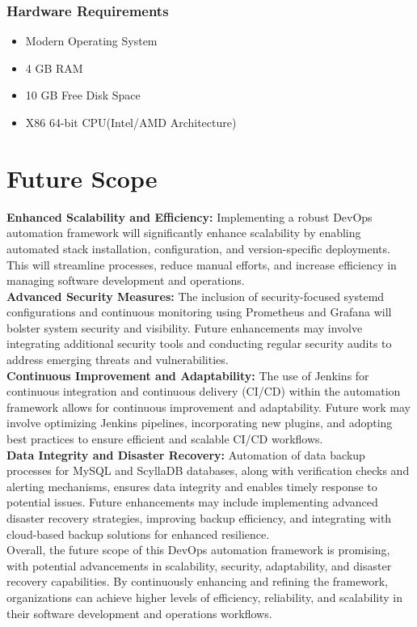 \documentclass[12pt,a4paper,oneside]{report}
\begin{document}
\subsection{Hardware Requirements}

\begin{itemize}
\item{Modern Operating System}
\item{4 GB RAM}
\item{10 GB Free Disk Space}
\item{X86 64-bit CPU(Intel/AMD Architecture)}
\end{itemize}




\newpage
\chapter{Future Scope}
\textbf{Enhanced Scalability and Efficiency: }Implementing a robust DevOps automation framework will significantly enhance scalability by enabling automated stack installation, configuration, and version-specific deployments. This will streamline processes, reduce manual efforts, and increase efficiency in managing software development and operations. \\
\textbf{Advanced Security Measures: } The inclusion of security-focused systemd configurations and continuous monitoring using Prometheus and Grafana will bolster system security and visibility. Future enhancements may involve integrating additional security tools and conducting regular security audits to address emerging threats and vulnerabilities. \\
\textbf{Continuous Improvement and Adaptability: }The use of Jenkins for continuous integration and continuous delivery (CI/CD) within the automation framework allows for continuous improvement and adaptability. Future work may involve optimizing Jenkins pipelines, incorporating new plugins, and adopting best practices to ensure efficient and scalable CI/CD workflows. \\
\textbf{Data Integrity and Disaster Recovery: }Automation of data backup processes for MySQL and ScyllaDB databases, along with verification checks and alerting mechanisms, ensures data integrity and enables timely response to potential issues. Future enhancements may include implementing advanced disaster recovery strategies, improving backup efficiency, and integrating with cloud-based backup solutions for enhanced resilience.\\
Overall, the future scope of this DevOps automation framework is promising, with potential advancements in scalability, security, adaptability, and disaster recovery capabilities. By continuously enhancing and refining the framework, organizations can achieve higher levels of efficiency, reliability, and scalability in their software development and operations workflows.
\end{document}
